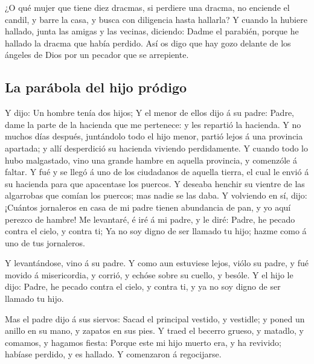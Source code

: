  ¿O qué mujer que tiene diez dracmas, si perdiere una
dracma, no enciende el candil, y barre la casa, y busca con diligencia
hasta hallarla?  Y cuando la hubiere hallado, junta las
amigas y las vecinas, diciendo: Dadme el parabién, porque he hallado la
dracma que había perdido.  Así os digo que hay gozo
delante de los ángeles de Dios por un pecador que se arrepiente.

\hypertarget{la-paruxe1bola-del-hijo-pruxf3digo}{%
\subsection{La parábola del hijo
pródigo}\label{la-paruxe1bola-del-hijo-pruxf3digo}}

 Y dijo: Un hombre tenía dos hijos;  Y el
menor de ellos dijo á su padre: Padre, dame la parte de la hacienda que
me pertenece: y les repartió la hacienda.  Y no muchos
días después, juntándolo todo el hijo menor, partió lejos á una
provincia apartada; y allí desperdició su hacienda viviendo
perdidamente.  Y cuando todo lo hubo malgastado, vino una
grande hambre en aquella provincia, y comenzóle á faltar.
 Y fué y se llegó á uno de los ciudadanos de aquella
tierra, el cual le envió á su hacienda para que apacentase los puercos.
 Y deseaba henchir su vientre de las algarrobas que
comían los puercos; mas nadie se las daba.  Y volviendo
en sí, dijo: ¡Cuántos jornaleros en casa de mi padre tienen abundancia
de pan, y yo aquí perezco de hambre!  Me levantaré, é iré
á mi padre, y le diré: Padre, he pecado contra el cielo, y contra ti;
 Ya no soy digno de ser llamado tu hijo; hazme como á uno
de tus jornaleros.

 Y levantándose, vino á su padre. Y como aun estuviese
lejos, viólo su padre, y fué movido á misericordia, y corrió, y echóse
sobre su cuello, y besóle.  Y el hijo le dijo: Padre, he
pecado contra el cielo, y contra ti, y ya no soy digno de ser llamado tu
hijo.

 Mas el padre dijo á sus siervos: Sacad el principal
vestido, y vestidle; y poned un anillo en su mano, y zapatos en sus
pies.  Y traed el becerro grueso, y matadlo, y comamos, y
hagamos fiesta:  Porque este mi hijo muerto era, y ha
revivido; habíase perdido, y es hallado. Y comenzaron á regocijarse.

